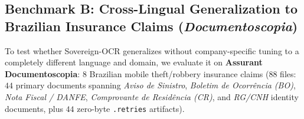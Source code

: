 \documentclass[10pt,twocolumn,letterpaper]{article}
\begin{document}
\begin{table}[t]
\centering
\caption{Sideways Brazilian Identity Card (\texttt{44087628R / Documento de identifica\c{c}\~{a}o}, $740\times 1953\,\text{px}$): Impact of Stage~2 Interior-Crop $90^\circ$ Rotation and DPI-Aware Lanczos Upscaling ($1.2162\times \to 2375\times 900\,\text{px}$).}
\label{tab:rg_comparison}
\vspace{-0.5em}
\end{table}

\subsection{Benchmark B: Cross-Lingual Generalization to Brazilian Insurance Claims (\emph{Documentoscopia})}

To test whether Sovereign-OCR generalizes without company-specific tuning to a completely different language and domain, we evaluate it on \textbf{Assurant Documentoscopia}: $8$ Brazilian mobile theft/robbery insurance claims ($88$ files: $44$ primary documents spanning \emph{Aviso de Sinistro}, \emph{Boletim de Ocorr\^{e}ncia (BO)}, \emph{Nota Fiscal / DANFE}, \emph{Comprovante de Resid\^{e}ncia (CR)}, and \emph{RG/CNH} identity documents, plus $44$ zero-byte \texttt{.retries} artifacts).
\end{document}
